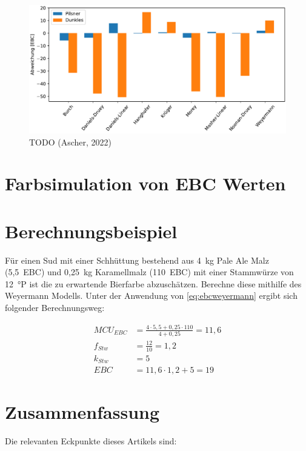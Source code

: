 \documentclass[a4paper,parskip=half]{scrartcl}
\newcommand{\MCUEBC}{\mathit{MCU}_{EBC}}
\newcommand{\EBC}{\mathit{EBC}}
\newcommand{\fstw}{f_{Stw}}
\newcommand{\kstw}{k_{Stw}}
\begin{document}
\begin{figure}[h]
\centering
\includegraphics[width=14cm]{graph_dev.pdf}
\caption{TODO (Ascher, 2022)}
\label{fig:modelcompare}
\end{figure}

\section*{Farbsimulation von EBC Werten}



\section*{Berechnungsbeispiel}

Für einen Sud mit einer Schhüttung bestehend aus 4~kg Pale Ale Malz (5,5~EBC) und 0,25~kg Kara­mell­mal­z (110~EBC) mit einer Stammwürze von 12~°P ist die zu erwartende Bierfarbe abzuschätzen. Berechne diese mithilfe des Weyermann Modells. Unter der Anwendung von \autoref{eq:ebcweyermann} ergibt sich folgender Berechnungsweg:

\begin{align*}
\MCUEBC &= \frac{4 \cdot 5,5 + 0,25 \cdot 110}{4 + 0,25} = 11,6 \\
\fstw &= \frac{12}{10} = 1,2 \\
\kstw &= 5 \\
\EBC &= 11,6 \cdot 1,2 + 5 = 19
\end{align*}

\section*{Zusammenfassung}


\parencite{Bruecklmeier2018}
\parencite{Bies2010}
\parencite{Tucker2017}
\parencite{Lange2016}

Die relevanten Eckpunkte dieses Artikels sind:
\end{document}
